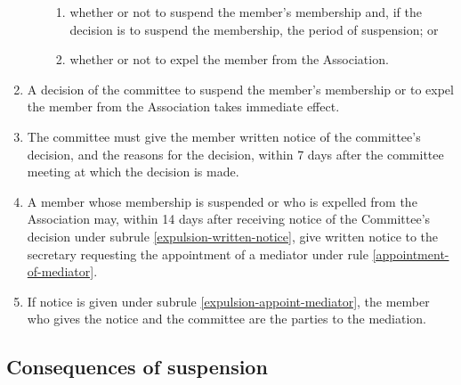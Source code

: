 \documentclass[../constitution.tex]{subfiles}
\begin{document}
\begin{enumerate}
\begin{enumerate}
    \begin{enumerate}
    
    \item whether or not to suspend the member's membership and, if the decision is to suspend the membership, the period of suspension; or
    \item whether or not to expel the member from the Association.
    \end{enumerate}
  \end{enumerate}
\item A decision of the committee to suspend the member's membership or to expel the member from the Association takes immediate effect.
\item The committee must give the member written notice of the committee's decision, and the reasons for the decision, within 7 days after the committee meeting at which the decision is made. \label{expulsion-written-notice}
\item A member whose membership is suspended or who is expelled from the Association may, within 14 days after receiving notice of the Committee's decision under subrule \ref{expulsion-written-notice}, give written notice to the secretary requesting the appointment of a mediator under rule \ref{appointment-of-mediator}. \label{expulsion-appoint-mediator}
\item If notice is given under subrule \ref{expulsion-appoint-mediator}, the member who gives the notice and the committee are the parties to the mediation.
\end{enumerate}

\hypertarget{consequences-of-suspension}{%
\subsection{Consequences of suspension}\label{consequences-of-suspension}}
\end{document}
